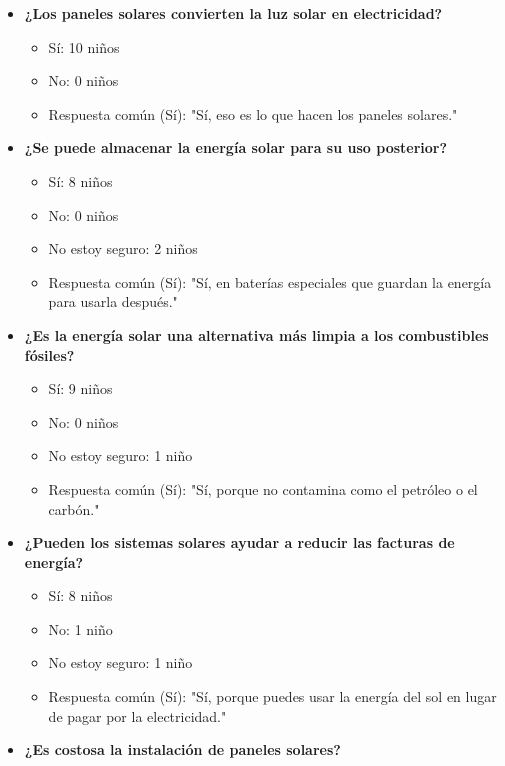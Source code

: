 \documentclass[12pt]{article}
\begin{document}
\begin{itemize}
\begin{itemize}
            \end{itemize}
      \item \textbf{¿Los paneles solares convierten la luz solar en electricidad?}
            \begin{itemize}
                  \item Sí: 10 niños
                  \item No: 0 niños
                  \item Respuesta común (Sí): "Sí, eso es lo que hacen los paneles solares."
            \end{itemize}
      \item \textbf{¿Se puede almacenar la energía solar para su uso posterior?}
            \begin{itemize}
                  \item Sí: 8 niños
                  \item No: 0 niños
                  \item No estoy seguro: 2 niños
                  \item Respuesta común (Sí): "Sí, en baterías especiales que guardan la energía para usarla después."
            \end{itemize}
      \item \textbf{¿Es la energía solar una alternativa más limpia a los combustibles fósiles?}
            \begin{itemize}
                  \item Sí: 9 niños
                  \item No: 0 niños
                  \item No estoy seguro: 1 niño
                  \item Respuesta común (Sí): "Sí, porque no contamina como el petróleo o el carbón."
            \end{itemize}
      \item \textbf{¿Pueden los sistemas solares ayudar a reducir las facturas de energía?}
            \begin{itemize}
                  \item Sí: 8 niños
                  \item No: 1 niño
                  \item No estoy seguro: 1 niño
                  \item Respuesta común (Sí): "Sí, porque puedes usar la energía del sol en lugar de pagar por la electricidad."
            \end{itemize}
      \item \textbf{¿Es costosa la instalación de paneles solares?}

\end{itemize}
\end{document}
